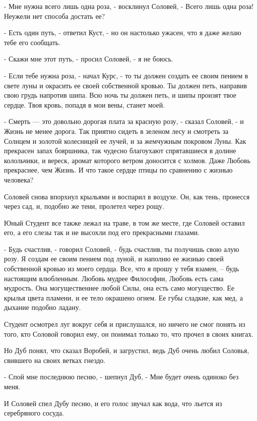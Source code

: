 \documentclass[a4paper]{article}
\theoremstyle{defin}
\theoremstyle{theorem}
\theoremstyle{prop}
\theoremstyle{lemma}
\theoremstyle{ex}
\theoremstyle{col}
\begin{document}
- Мне нужна всего лишь одна роза, - восклинул Соловей, - Всего лишь одна роза! Неужели нет способа достать ее?

- Есть один путь, - ответил Куст, - но он настолько ужасен, что я даже желаю тебе его сообщать.

- Скажи мне этот путь, - просил Соловей, - я не боюсь.

- Если тебе нужна роза, - начал Курс, - то ты должен создать ее своим пением в свете луны и окрасить ее своей собственной кровью. Ты должен петь, направив свою грудь напротив шипа. Всю ночь ты должен петь, и шипы пронзят твое сердце. Твоя кровь, попадя в мои вены, станет моей.

- Смерть --- это довольно дорогая плата за красную розу, - сказал Соловей, - и Жизнь не менее дорога. Так приятно сидеть в зеленом лесу и смотреть за Солнцем и золотой колесницей ее лучей, и за жемчужным покровом Луны. Как прекрасен запах бояршника, так чудесно благоухают спрятавшиеся в долине колольчики, и вереск, аромат которого ветром доносится с холмов. Даже Любовь прекраснее, чем Жизнь. И что такое сердце птицы по сравнению с жизнью человека?

Соловей снова впорхнул крыльями и воспарил в воздухе. Он, как тень, пронесся через сад, и, подобно же тени, пролетел через рощу.

Юный Студент все также лежал на траве, в том же месте, где Соловей оставил его, а его слезы так и не высохли под его прекрасными глазами.

- Будь счастлив, - говорил Соловей, - будь счастлив, ты получишь свою алую розу. Я создам ее своим пением под луной, и наполню ее жизнью своей собственной кровью из моего сердца. Все, что я прошу у тебя взамен, -- будь настоящим влюбленным. Любовь мудрее Философии, Любовь есть сама мудрость. Она могущественнее любой Силы, она есть само могущество. Ее крылья цвета пламени, и ее тело окрашено огнем. Ее губы сладкие, как мед, а дыхание подобно ладану.

Студент осмотрел луг вокруг себя и прислушался, но ничего не смог понять из того, кто Соловой говорил ему, он понимал только то, что прочел в своих книгах.

Но Дуб понял, что сказал Воробей, и загрустил, ведь Дуб очень любил Соловья, свившего на своих ветках гнездо.

- Спой мне последнюю песню, - шепнул Дуб, - Мне будет очень одиноко без меня.

И Соловей спел Дубу песню, и его голос звучал как вода, что льется из серебряного сосуда.
\end{document}
